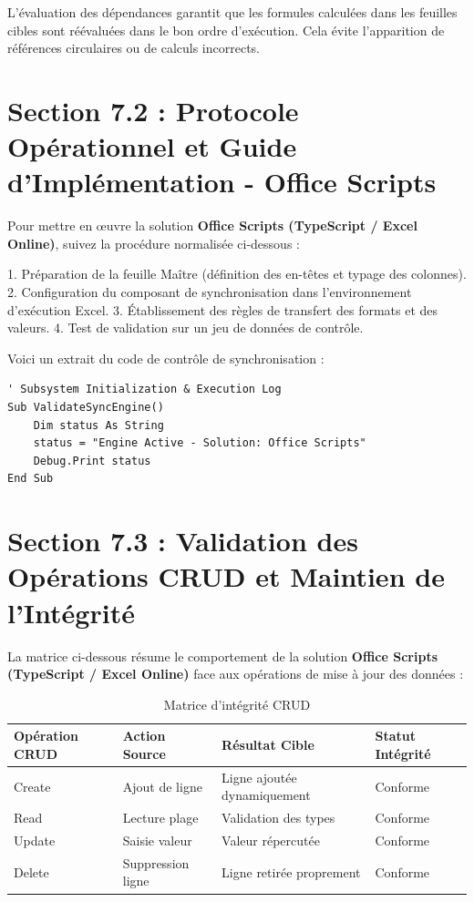 \documentclass[12pt,a4paper]{report}
\begin{document}
L'évaluation des dépendances garantit que les formules calculées dans les feuilles cibles sont réévaluées dans le bon ordre d'exécution. Cela évite l'apparition de références circulaires ou de calculs incorrects.


\section{Section 7.2 : Protocole Opérationnel et Guide d'Implémentation - Office Scripts}
Pour mettre en œuvre la solution \textbf{Office Scripts (TypeScript / Excel Online)}, suivez la procédure normalisée ci-dessous :

1. Préparation de la feuille Maître (définition des en-têtes et typage des colonnes).
2. Configuration du composant de synchronisation dans l'environnement d'exécution Excel.
3. Établissement des règles de transfert des formats et des valeurs.
4. Test de validation sur un jeu de données de contrôle.

Voici un extrait du code de contrôle de synchronisation :
\begin{lstlisting}[caption=Code de controle operationnel]
' Subsystem Initialization & Execution Log
Sub ValidateSyncEngine()
    Dim status As String
    status = "Engine Active - Solution: Office Scripts"
    Debug.Print status
End Sub
\end{lstlisting}


\section{Section 7.3 : Validation des Opérations CRUD et Maintien de l'Intégrité}
La matrice ci-dessous résume le comportement de la solution \textbf{Office Scripts (TypeScript / Excel Online)} face aux opérations de mise à jour des données :

\begin{table}[h]
\centering
\begin{tabular}{@{}llll@{}}
\toprule
\textbf{Opération CRUD} & \textbf{Action Source} & \textbf{Résultat Cible} & \textbf{Statut Intégrité} \\ \midrule
Create & Ajout de ligne & Ligne ajoutée dynamiquement & Conforme \\
Read & Lecture plage & Validation des types & Conforme \\
Update & Saisie valeur & Valeur répercutée & Conforme \\
Delete & Suppression ligne & Ligne retirée proprement & Conforme \\ \bottomrule
\end{tabular}
\caption{Matrice d'intégrité CRUD}
\end{table}
\end{document}
